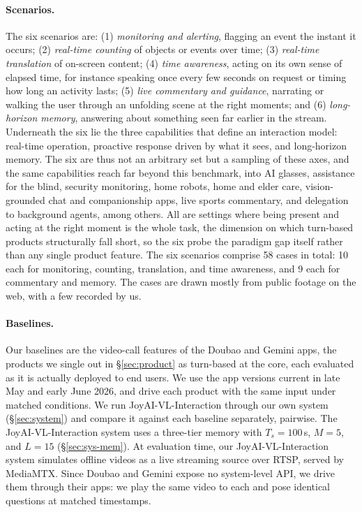 \paragraph{\textbf{Scenarios.}} The six scenarios are: (1) \textit{monitoring and alerting}, flagging an event the instant it occurs; (2) \textit{real-time counting} of objects or events over time; (3) \textit{real-time translation} of on-screen content; (4) \textit{time awareness}, acting on its own sense of elapsed time, for instance speaking once every few seconds on request or timing how long an activity lasts; (5) \textit{live commentary and guidance}, narrating or walking the user through an unfolding scene at the right moments; and (6) \textit{long-horizon memory}, answering about something seen far earlier in the stream. Underneath the six lie the three capabilities that define an interaction model: real-time operation, proactive response driven by what it sees, and long-horizon memory. The six are thus not an arbitrary set but a sampling of these axes, and the same capabilities reach far beyond this benchmark, into AI glasses, assistance for the blind, security monitoring, home robots, home and elder care, vision-grounded chat and companionship apps, live sports commentary, and delegation to background agents, among others. All are settings where being present and acting at the right moment is the whole task, the dimension on which turn-based products structurally fall short, so the six probe the paradigm gap itself rather than any single product feature.
The six scenarios comprise 58 cases in total: 10 each for monitoring, counting, translation, and time awareness, and 9 each for commentary and memory. 
The cases are drawn mostly from public footage on the web, with a few recorded by us.

\paragraph{\textbf{Baselines.}} Our baselines are the video-call features of the Doubao and Gemini apps, the products we single out in \S\ref{sec:product} as turn-based at the core, each evaluated as it is actually deployed to end users. We use the app versions current in late May and early June 2026, and drive each product with the same input under matched conditions. We run JoyAI-VL-Interaction through our own system (\S\ref{sec:system}) and compare it against each baseline separately, pairwise. 
The JoyAI-VL-Interaction system uses a three-tier memory with $T_s=100$\,s, $M=5$, and $L=15$ (\S\ref{sec:sys-mem}).
At evaluation time, our JoyAI-VL-Interaction system simulates offline videos as a live streaming source over RTSP, served by MediaMTX.
Since Doubao and Gemini expose no system-level API, we drive them through their apps: we play the same video to each and pose identical questions at matched timestamps.


